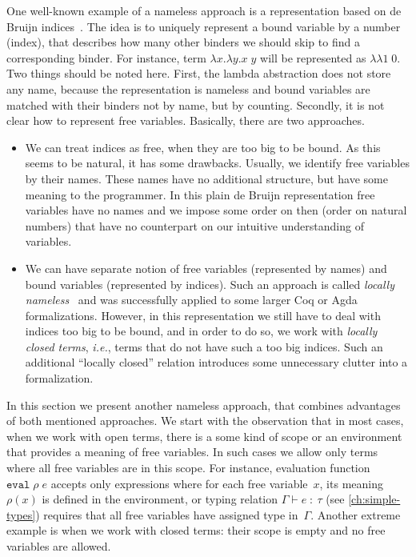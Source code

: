 One well-known example of a nameless approach is a representation based on
de Bruijn indices~\citep{deBruijn72}.
The idea is to uniquely represent a bound variable by a number (index),
that describes how many other binders we should skip to find
a corresponding binder.
For instance, term $\lambda x.\lambda y.x\;y$ will be
represented as $\lambda\lambda 1\;0$.
Two things should be noted here.
First, the lambda abstraction does not store any name,
because the representation is nameless and
bound variables are matched with their binders not by name,
but by counting.
Secondly, it is not clear how to represent free variables.
Basically, there are two approaches.
\begin{itemize}
\item We can treat indices as free, when they are too big to be bound.
  As this seems to be natural, it has some drawbacks.
  Usually, we identify free variables by their names.
  These names have no additional structure,
  but have some meaning to the programmer.
  In this plain de Bruijn representation free variables
  have no names and we impose some order on then (order on natural numbers)
  that have no counterpart on our intuitive understanding of variables.
\item We can have separate notion of free variables (represented by names)
  and bound variables (represented by indices).
  Such an approach is called
  \emph{locally nameless}~\citep{AydemirCPPW08,Chargueraud12}
  and was successfully applied to some larger Coq or Agda formalizations.
  However, in this representation we still have to deal with indices
  too big to be bound, and in order to do so,
  we work with \emph{locally closed terms}, \emph{i.e.},
  terms that do not have such a too big indices.
  Such an additional ``locally closed'' relation introduces some
  unnecessary clutter into a formalization.
\end{itemize}

In this section we present another nameless approach,
that combines advantages of both mentioned approaches.
We start with the observation that in most cases, when we work
with open terms, there is a some kind of scope or an environment
that provides a meaning of free variables.
In such cases we allow only terms where all free variables
are in this scope.
For instance, evaluation function $\texttt{eval}\;\rho\;e$
accepts only expressions where for each free variable~$x$,
its meaning $\rho(x)$ is defined in the environment,
or typing relation $\Gamma\vdash e\;:\:\tau$
(see \autoref{ch:simple-types})
requires that all free variables have assigned type in~$\Gamma$.
Another extreme example is when we work with closed terms:
their scope is empty and no free variables are allowed.


